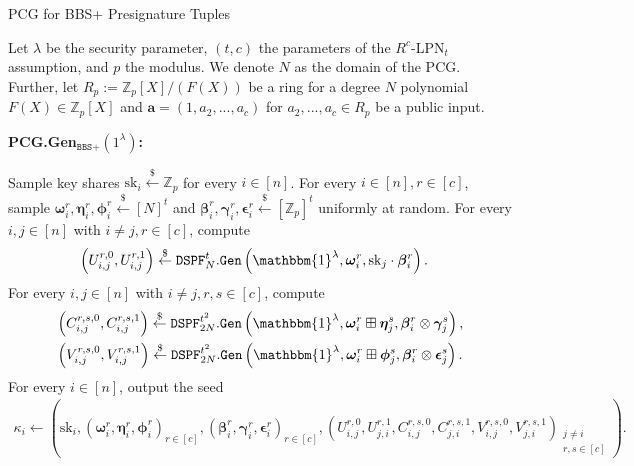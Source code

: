 \begin{specialconstruction}{PCG for BBS+ Presignature Tuples}
\label{construction:PCGforBBS+}
\vspace{1em}

Let $\lambda$ be the security parameter, $(t,c)$ the parameters of the $R^c$-LPN$_t$ assumption, and $p$ the modulus. We denote $N$ as the domain of the PCG. Further, let $R_p:=\mathbb{Z}_{p}[X]/(F(X))$ be a ring for a degree $N$ polynomial $F(X) \in \mathbb{Z}_{p}[X]$ and $\boldsymbol{a} = (1, a_2, ..., a_c)$ for $a_2, ...,a_c \in R_p$ be a public input.

\vspace{1em}

\textbf{PCG.Gen$_{\texttt{BBS+}}(1^\lambda)$:}

\begin{algorithmic}[1]
\State Sample key shares $\mathrm{sk}_{i} \stackrel{\$}{\leftarrow} \mathbb{Z}_{p}$ for every $i \in [n]$.
\State For every $i \in [n], r \in [c]$, sample $\boldsymbol{\omega}_{i}^{r}, \boldsymbol{\eta}_{i}^{r}, \boldsymbol{\phi}_{i}^{r} \stackrel{\$}{\leftarrow} [N]^{t}$ and $\boldsymbol{\beta}_{i}^{r}, \boldsymbol{\gamma}_{i}^{r}, \boldsymbol{\epsilon}_{i}^{r} \stackrel{\$}{\leftarrow} [\mathbb{Z}_{p}]^{t}$ uniformly at random.
\State For every $i, j \in [n]$ with $i \neq j, r \in [c]$, compute
\begin{align*}
& \left(U_{i, j}^{r, 0}, U_{i, j}^{r, 1}\right) \stackrel{\$}{\leftarrow} \texttt{DSPF}_{N}^{t}.\texttt{Gen}\left(\mathbbm{1}^{\lambda}, \boldsymbol{\omega}_{i}^{r}, \mathrm{sk}_{j} \cdot \boldsymbol{\beta}_{i}^{r}\right).
\end{align*}
\State For every $i, j \in [n]$ with $i \neq j, r, s \in [c]$, compute
\begin{align*}
& \left(C_{i, j}^{r, s, 0}, C_{i, j}^{r, s, 1}\right)\stackrel{\$}{\leftarrow} \texttt{DSPF}_{2N}^{t^{2}}.\texttt{Gen}\left(\mathbbm{1}^{\lambda}, \boldsymbol{\omega}_{i}^{r} \boxplus \boldsymbol{\eta}_{j}^{s}, \boldsymbol{\beta}_{i}^{r} \otimes \boldsymbol{\gamma}_{j}^{s}\right), \\
& \left(V_{i, j}^{r, s, 0}, V_{i, j}^{r, s, 1}\right) \stackrel{\$}{\leftarrow} \texttt{DSPF}_{2N}^{t^{2}}.\texttt{Gen}\left(\mathbbm{1}^{\lambda}, \boldsymbol{\omega}_{i}^{r} \boxplus \boldsymbol{\phi}_{j}^{s}, \boldsymbol{\beta}_{i}^{r} \otimes \boldsymbol{\epsilon}_{j}^{s}\right).
\end{align*}
\State For every $i \in [n]$, output the seed
\begin{align*}
\kappa_{i} \leftarrow\left(\mathrm{sk}_{i},\left(\boldsymbol{\omega}_{i}^{r}, \boldsymbol{\eta}_{i}^{r}, \boldsymbol{\phi}_{i}^{r}\right)_{r \in [c]},\left(\boldsymbol{\beta}_{i}^{r}, \boldsymbol{\gamma}_{i}^{r}, \boldsymbol{\epsilon}_{i}^{r}\right)_{r \in [c]},\left(U_{i, j}^{r, 0}, U_{j, i}^{r, 1}, C_{i, j}^{r, s, 0}, C_{j, i}^{r, s, 1}, V_{i, j}^{r, s, 0}, V_{j, i}^{r, s, 1}\right)_{\substack{j \neq i \\ r, s \in [c]}}\right).
\end{align*}
\end{algorithmic}


\end{specialconstruction}
